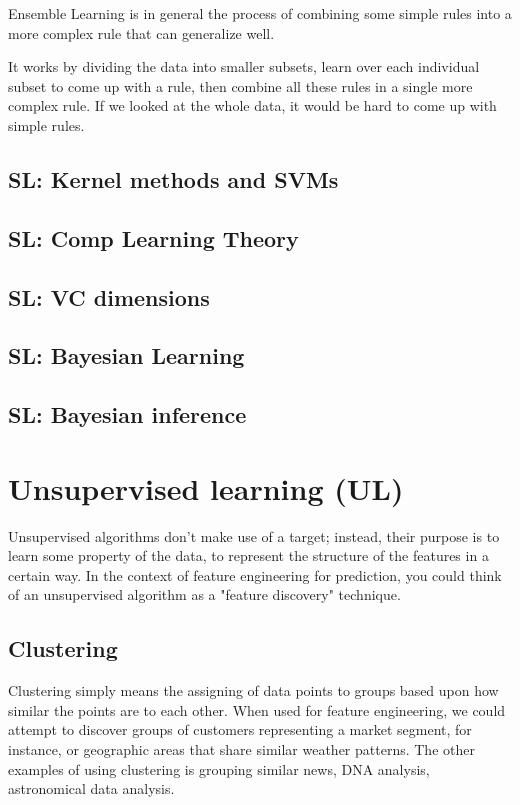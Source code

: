 \documentclass[12pt]{report}
\begin{document}
Ensemble Learning is in general the process of combining some simple rules into a more complex rule that can generalize well.

It works by dividing the data into smaller subsets, learn over each individual subset to come up with a rule, then combine all these rules in a single more complex rule. If we looked at the whole data, it would be hard to come up with simple rules.




\section{SL: Kernel methods and SVMs}
\section{SL: Comp Learning Theory}
\section{SL: VC dimensions}
\section{SL: Bayesian Learning}
\section{SL: Bayesian inference}


\chapter[Unsupervised learning]{Unsupervised learning (UL)}

Unsupervised algorithms don't make use of a target; instead, their purpose is to learn some property of the data, to represent the structure of the features in a certain way. In the context of feature engineering for prediction, you could think of an unsupervised algorithm as a "feature discovery" technique.

\section{Clustering}
Clustering simply means the assigning of data points to groups based upon how similar the points are to each other. When used for feature engineering, we could attempt to discover groups of customers representing a market segment, for instance, or geographic areas that share similar weather patterns. The other examples of using clustering is grouping similar news, DNA analysis, astronomical data analysis.
\end{document}
